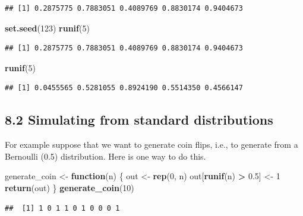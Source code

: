 \documentclass[]{article}
\newenvironment{Shaded}{\begin{snugshade}}{\end{snugshade}}
\newcommand{\KeywordTok}[1]{\textcolor[rgb]{0.13,0.29,0.53}{\textbf{#1}}}
\newcommand{\DecValTok}[1]{\textcolor[rgb]{0.00,0.00,0.81}{#1}}
\newcommand{\FloatTok}[1]{\textcolor[rgb]{0.00,0.00,0.81}{#1}}
\newcommand{\StringTok}[1]{\textcolor[rgb]{0.31,0.60,0.02}{#1}}
\newcommand{\ControlFlowTok}[1]{\textcolor[rgb]{0.13,0.29,0.53}{\textbf{#1}}}
\newcommand{\OperatorTok}[1]{\textcolor[rgb]{0.81,0.36,0.00}{\textbf{#1}}}
\newcommand{\NormalTok}[1]{#1}
\begin{document}
\begin{verbatim}
## [1] 0.2875775 0.7883051 0.4089769 0.8830174 0.9404673
\end{verbatim}

\begin{Shaded}
\begin{Highlighting}[]
\KeywordTok{set.seed}\NormalTok{(}\DecValTok{123}\NormalTok{)}
\KeywordTok{runif}\NormalTok{(}\DecValTok{5}\NormalTok{)}
\end{Highlighting}
\end{Shaded}

\begin{verbatim}
## [1] 0.2875775 0.7883051 0.4089769 0.8830174 0.9404673
\end{verbatim}

\begin{Shaded}
\begin{Highlighting}[]
\KeywordTok{runif}\NormalTok{(}\DecValTok{5}\NormalTok{)}
\end{Highlighting}
\end{Shaded}

\begin{verbatim}
## [1] 0.0455565 0.5281055 0.8924190 0.5514350 0.4566147
\end{verbatim}

\subsection{8.2 Simulating from standard
distributions}\label{simulating-from-standard-distributions}

For example suppose that we want to generate coin flips, i.e., to
generate from a Bernoulli (0.5) distribution. Here is one way to do
this.

\begin{Shaded}
\begin{Highlighting}[]
\NormalTok{generate_coin <-}\StringTok{ }\ControlFlowTok{function}\NormalTok{(n) \{}
\NormalTok{    out <-}\StringTok{ }\KeywordTok{rep}\NormalTok{(}\DecValTok{0}\NormalTok{, n)}
\NormalTok{    out[}\KeywordTok{runif}\NormalTok{(n) }\OperatorTok{>}\StringTok{ }\FloatTok{0.5}\NormalTok{] <-}\StringTok{ }\DecValTok{1}
    \KeywordTok{return}\NormalTok{(out)}
\NormalTok{\}}
\KeywordTok{generate_coin}\NormalTok{(}\DecValTok{10}\NormalTok{)}
\end{Highlighting}
\end{Shaded}

\begin{verbatim}
##  [1] 1 0 1 1 0 1 0 0 0 1
\end{verbatim}
\end{document}
